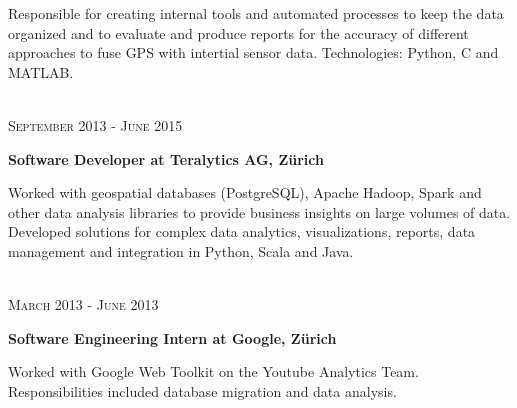 \documentclass[10pt]{article} %
\begin{document}
\begin{minipage}[t]{0.5\textwidth}
\normalsize{ Responsible for creating internal tools and automated processes to keep the data organized and to evaluate and produce reports for the accuracy of different approaches to fuse GPS with intertial sensor data. Technologies: Python, C and MATLAB.}
\\
\\
{\raggedleft\textsc{September 2013 - June 2015}\par}

{\raggedright\large \textbf{Software Developer at Teralytics AG, Z\"urich}\\
}

\normalsize{Worked with geospatial databases (PostgreSQL), Apache Hadoop, Spark and other data analysis libraries to provide business insights on large volumes of data. Developed solutions for complex data analytics, visualizations, reports, data management and integration in Python, Scala and Java.}
\\
\\
{\raggedleft\textsc{March 2013 - June 2013}\par}

{\raggedright\large \textbf{Software Engineering Intern at Google, Z\"urich}\\
}

\normalsize{Worked with Google Web Toolkit on the Youtube Analytics Team. Responsibilities included database migration and data analysis.}\\











	

\end{minipage} %
\end{document}
